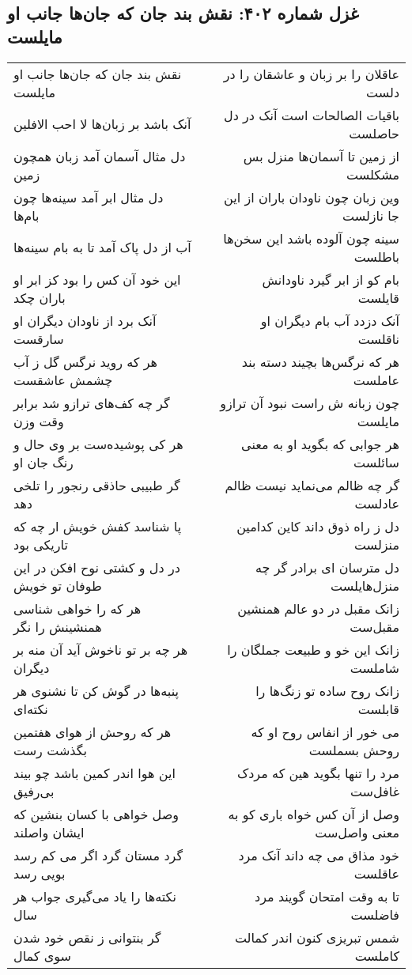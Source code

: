 \begin{center}
\section*{غزل شماره ۴۰۲: نقش بند جان که جان‌ها جانب او مایلست}
\label{sec:0402}
\begin{longtable}{l p{0.5cm} r}
نقش بند جان که جان‌ها جانب او مایلست
&&
عاقلان را بر زبان و عاشقان را در دلست
\\
آنک باشد بر زبان‌ها لا احب الافلین
&&
باقیات الصالحات است آنک در دل حاصلست
\\
دل مثال آسمان آمد زبان همچون زمین
&&
از زمین تا آسمان‌ها منزل بس مشکلست
\\
دل مثال ابر آمد سینه‌ها چون بام‌ها
&&
وین زبان چون ناودان باران از این جا نازلست
\\
آب از دل پاک آمد تا به بام سینه‌ها
&&
سینه چون آلوده باشد این سخن‌ها باطلست
\\
این خود آن کس را بود کز ابر او باران چکد
&&
بام کو از ابر گیرد ناودانش قایلست
\\
آنک برد از ناودان دیگران او سارقست
&&
آنک دزدد آب بام دیگران او ناقلست
\\
هر که روید نرگس گل ز آب چشمش عاشقست
&&
هر که نرگس‌ها بچیند دسته بند عاملست
\\
گر چه کف‌های ترازو شد برابر وقت وزن
&&
چون زبانه ش راست نبود آن ترازو مایلست
\\
هر کی پوشیده‌ست بر وی حال و رنگ جان او
&&
هر جوابی که بگوید او به معنی سائلست
\\
گر طبیبی حاذقی رنجور را تلخی دهد
&&
گر چه ظالم می‌نماید نیست ظالم عادلست
\\
پا شناسد کفش خویش ار چه که تاریکی بود
&&
دل ز راه ذوق داند کاین کدامین منزلست
\\
در دل و کشتی نوح افکن در این طوفان تو خویش
&&
دل مترسان ای برادر گر چه منزل‌هایلست
\\
هر که را خواهی شناسی همنشینش را نگر
&&
زانک مقبل در دو عالم همنشین مقبل‌ست
\\
هر چه بر تو ناخوش آید آن منه بر دیگران
&&
زانک این خو و طبیعت جملگان را شاملست
\\
پنبه‌ها در گوش کن تا نشنوی هر نکته‌ای
&&
زانک روح ساده تو زنگ‌ها را قابلست
\\
هر که روحش از هوای هفتمین بگذشت رست
&&
می خور از انفاس روح او که روحش بسملست
\\
این هوا اندر کمین باشد چو بیند بی‌رفیق
&&
مرد را تنها بگوید هین که مردک غافل‌ست
\\
وصل خواهی با کسان بنشین که ایشان واصلند
&&
وصل از آن کس خواه باری کو به معنی واصل‌ست
\\
گرد مستان گرد اگر می کم رسد بویی رسد
&&
خود مذاق می چه داند آنک مرد عاقلست
\\
نکته‌ها را یاد می‌گیری جواب هر سال
&&
تا به وقت امتحان گویند مرد فاضلست
\\
گر بنتوانی ز نقص خود شدن سوی کمال
&&
شمس تبریزی کنون اندر کمالت کاملست
\\
\end{longtable}
\end{center}
